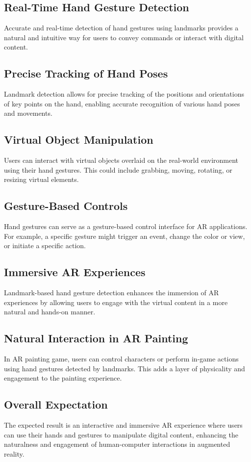 \documentclass[journal]{IEEEtran}
\begin{document}
\subsection*{Real-Time Hand Gesture Detection}
Accurate and real-time detection of hand gestures using landmarks provides a natural and intuitive way for users to convey commands or 
interact with digital content.
\subsection*{Precise Tracking of Hand Poses}
Landmark detection allows for precise tracking of the positions and orientations of key points on the hand, enabling accurate 
recognition of various hand poses and movements.
\subsection*{Virtual Object Manipulation}
Users can interact with virtual objects overlaid on the real-world environment using their hand gestures. This could include 
grabbing, moving, rotating, or resizing virtual elements.
\subsection*{Gesture-Based Controls}
Hand gestures can serve as a gesture-based control interface for AR applications. For example, a specific gesture might trigger 
an event, change the color or view, or initiate a specific action.
\subsection*{Immersive AR Experiences}
Landmark-based hand gesture detection enhances the immersion of AR experiences by allowing users to engage with the virtual 
content in a more natural and hands-on manner.
\subsection*{Natural Interaction in AR Painting}
In AR painting game, users can control characters or perform in-game actions using hand gestures detected by landmarks. This adds a 
layer of physicality and engagement to the painting experience.
\subsection*{Overall Expectation}
The expected result is an interactive and immersive AR experience where users can use their hands and gestures to 
manipulate digital content, enhancing the naturalness and engagement of human-computer interactions in augmented reality.
\end{document}
